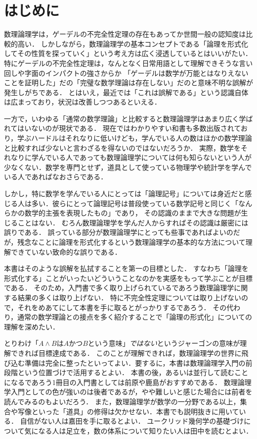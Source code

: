 \chapter{はじめに}

数理論理学は，ゲーデルの不完全性定理の存在もあってか世間一般の認知度は比較的高い．
しかしながら，数理論理学の基本コンセプトである「論理を形式化してその性質を探っていく」という考え方は広く浸透しているとはいいがたい．
特にゲーデルの不完全性定理は，なんとなく日常用語として理解できそうな言い回しや字面のインパクトの強さからか
「ゲーデルは数学が万能とはなりえないことを証明した」だの「完璧な数学理論は存在しない」だのと意味不明な誤解が発生しがちである．
とはいえ，最近では「これは誤解である」という認識自体は広まっており，状況は改善しつつあるといえる．

一方で，いわゆる「通常の数学理論」と比較すると数理論理学はあまり広く学ばれてはいないのが現状である．
現在ではわかりやすい和書も多数出版されており，学ぶハードルはそれなりに低いけども，学んでいる人の数はほかの数学理論と比較すれば少ないと言わざるを得ないのではないだろうか．
実際，数学をそれなりに学んでいる人であっても数理論理学については何も知らないという人が少なくない．数学を専門とせず，道具として使っている物理学や統計学を学んでいる人であればなおさらである．

しかし，特に数学を学んでいる人にとっては「論理記号」については身近だと感じる人は多い．彼らにとって論理記号は普段使っている数学記号と同じく「なんらかの数学的主張を表現したもの」であり，
その認識のままで大きな問題が生じることはない．
むろん数理論理学を学んだ人からすればその認識は厳密には誤りである．
誤っている部分が数理論理学にとっても些事であればよいのだが，残念なことに論理を形式化するという数理論理学の基本的な方法について理解できていない致命的な誤りである．

本書はそのような誤解を払拭することを第一の目標とした．
すなわち「論理を形式化する」ことがいったいどういうことなのかを実感をもって学ぶことが目標である．
そのため，入門書で多く取り上げられているであろう数理論理学に関する結果の多くは取り上げない．
特に不完全性定理については取り上げないので，それをめあてにして本書を手に取るとがっかりするであろう．
その代わり，通常の数学理論との接点を多く紹介することで「論理の形式化」についての理解を深めたい．

とりわけ「\(A \land B\)は\(A\)かつ\(B\)という意味」\emph{ではない}というジャーゴンの意味が理解できれば目標達成である．
このことが理解できれば，数理論理学の世界に飛び込む準備は完全に整ったといってよい．要するに，本書は数理論理学入門の前段階という位置づけで活用するとよい．
本書の後，あるいは並行して読むことになるであろう1冊目の入門書としては前原\cite{maehara2005}や鹿島\cite{kashima2009}がおすすめである．
数理論理学入門としての色が強いのは後者であるが，やや難しいと感じた場合には前者を読んでみるのもよいだろう．
また，数理論理学が数学の一分野である以上，集合や写像といった「道具」の修得は欠かせない．本書でも説明抜きに用いている．
自信がない人は嘉田\cite{kada2008}を手に取るとよい．
ユークリッド幾何学の基礎づけについて気になる人は足立\cite{adachi2019}を，数の体系について知りたい人は田中\cite{tanaka2019}を読むとよい．

